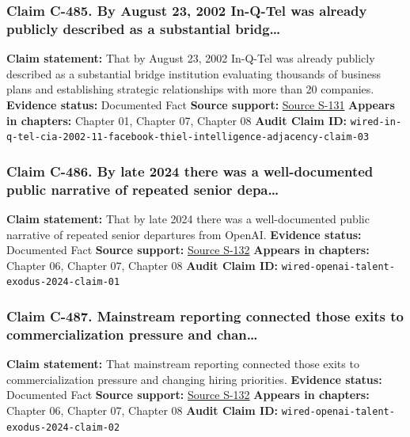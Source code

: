 \documentclass[
  american,
  11pt,
  letterpaper,
]{article}
\begin{document}
\subsubsection{Claim C-485. By August 23, 2002 In-Q-Tel was already
publicly described as a substantial
bridg\ldots{}}\label{claim-c-485-by-august-23-2002-in-q-tel-was-already-publicly-described-as-a-substantial-bridg}

\textbf{Claim statement:} That by August 23, 2002 In-Q-Tel was already
publicly described as a substantial bridge institution evaluating
thousands of business plans and establishing strategic relationships
with more than 20 companies. \textbf{Evidence status:} Documented Fact
\textbf{Source support:}
\hyperref[source-s-131-it-pays-to-play-with-the-cia]{Source S-131}
\textbf{Appears in chapters:} Chapter 01, Chapter 07, Chapter 08
\textbf{Audit Claim ID:}
\texttt{wired-in-q-tel-cia-2002-11-facebook-thiel-intelligence-adjacency-claim-03}

\subsubsection{Claim C-486. By late 2024 there was a well-documented
public narrative of repeated senior
depa\ldots{}}\label{claim-c-486-by-late-2024-there-was-a-well-documented-public-narrative-of-repeated-senior-depa}

\textbf{Claim statement:} That by late 2024 there was a well-documented
public narrative of repeated senior departures from OpenAI.
\textbf{Evidence status:} Documented Fact \textbf{Source support:}
\hyperref[source-s-132-the-openai-talent-exodus-gives-rivals-an-opening]{Source
S-132} \textbf{Appears in chapters:} Chapter 06, Chapter 07, Chapter 08
\textbf{Audit Claim ID:}
\texttt{wired-openai-talent-exodus-2024-claim-01}

\subsubsection{Claim C-487. Mainstream reporting connected those exits
to commercialization pressure and
chan\ldots{}}\label{claim-c-487-mainstream-reporting-connected-those-exits-to-commercialization-pressure-and-chan}

\textbf{Claim statement:} That mainstream reporting connected those
exits to commercialization pressure and changing hiring priorities.
\textbf{Evidence status:} Documented Fact \textbf{Source support:}
\hyperref[source-s-132-the-openai-talent-exodus-gives-rivals-an-opening]{Source
S-132} \textbf{Appears in chapters:} Chapter 06, Chapter 07, Chapter 08
\textbf{Audit Claim ID:}
\texttt{wired-openai-talent-exodus-2024-claim-02}
\end{document}
